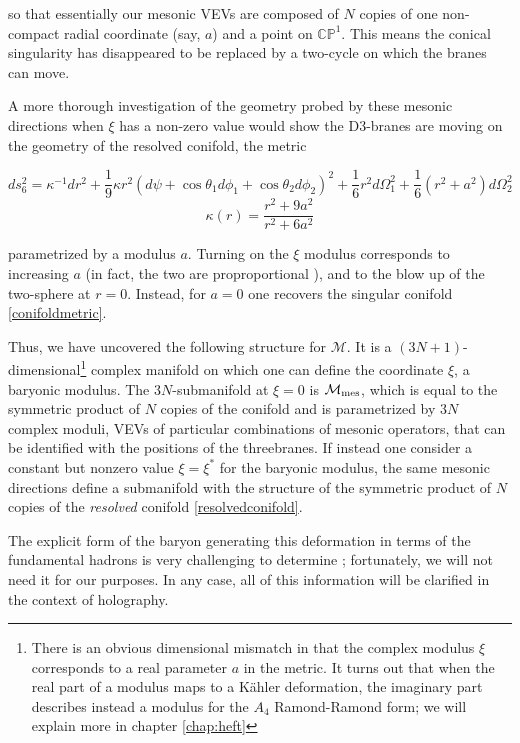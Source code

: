 so that essentially our mesonic VEVs are composed of $N$ copies of one non-compact radial coordinate (say, $a$) and a point on $\mathbb{CP}^1$. This means the conical singularity has disappeared to be replaced by a two-cycle on which the branes can move.

A more thorough investigation of the geometry probed by these mesonic directions when $\xi$ has a non-zero value would show the D3-branes are moving on the geometry of the resolved conifold, the metric \cite{PandoZayas}

\begin{equation}
	ds_6^2 = \kappa^{-1} dr^2 + \frac{1}{9} \kappa r^2 (d\psi + \cos\theta_1 d\phi_1 + \cos\theta_2 d\phi_2)^2 + \frac{1}{6} r^2 d\Omega_1^2 + \frac{1}{6} (r^2 + a^2 ) d\Omega_2^2\label{resolvedconifold}
\end{equation}
\begin{equation}
	\kappa(r) = \frac{r^2 + 9a^2}{r^2 + 6a^2}
	\label{}
\end{equation}

parametrized by a modulus $a$. Turning on the $\xi$ modulus corresponds to increasing $a$ (in fact, the two are proproportional \cite{MZ}), and to the blow up of the two-sphere at $r=0$. Instead, for $a=0$ one recovers the singular conifold \eqref{conifoldmetric}.

Thus, we have uncovered the following structure for $\mathcal{M}$. It is a $(3N + 1)$-dimensional\footnote{There is an obvious dimensional mismatch in that the complex modulus $\xi$ corresponds to a real parameter $a$ in the metric. It turns out that when the real part of a modulus maps to a K\"ahler deformation, the imaginary part describes instead a modulus for the $A_4$ Ramond-Ramond form; we will explain more in chapter \ref{chap:heft}} complex manifold on which one can define the coordinate $\xi$, a baryonic modulus. The $3N$-submanifold at $\xi = 0$ is $\mathcal{M}_\mathrm{mes}$, which is equal to the symmetric product of $N$ copies of the conifold and is parametrized by $3N$ complex moduli, VEVs of particular combinations of mesonic operators, that can be identified with the positions of the threebranes. If instead one consider a constant but nonzero value $\xi = \xi^*$ for the baryonic modulus, the same mesonic directions define a submanifold with the structure of the symmetric product of $N$ copies of the \emph{resolved} conifold \eqref{resolvedconifold}.

The explicit form of the baryon generating this deformation in terms of the fundamental hadrons is very challenging to determine \cite{Forcella}; fortunately, we will not need it for our purposes. In any case, all of this information will be clarified in the context of holography.



